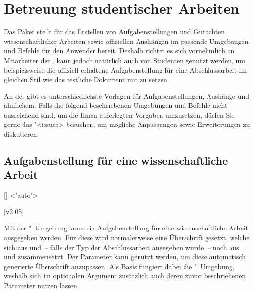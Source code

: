 \chapter[%
  Das Paket \PackageRaw{tudscrsupervisor}{\BooleanFalse}
  -- Studentische Betreuung%
]{%
  Betreuung studentischer Arbeiten%
}

\begin{DeclareEntity}{}
%
Das Paket  stellt für das Erstellen von 
Aufgabenstellungen und Gutachten wissenschaftlicher Arbeiten sowie offiziellen 
Aushängen im \CD passende Umgebungen und Befehle für den Anwender bereit. 
Deshalb richtet es sich vornehmlich an Mitarbeiter der \TnUD, kann jedoch 
natürlich auch von Studenten genutzt werden, um beispielsweise die offiziell 
erhaltene Aufgabenstellung für eine Abschlussarbeit im gleichen Stil wie das 
restliche Dokument mit  zu setzen.

An der \TUD gibt es unterschiedlichste Vorlagen für Aufgabenstellungen, 
Aushänge und ähnlichem. Falls die folgend beschriebenen Umgebungen und Befehle 
nicht ausreichend sind, um die Ihnen auferlegten Vorgaben umzusetzen, dürfen 
Sie gerne das \GitHubRepo'<issues> besuchen, um mögliche Anpassungen sowie 
Erweiterungen zu diskutieren.



\section{%
  Aufgabenstellung für eine wissenschaftliche Arbeit%
}

\begin{Declaration}
  {[]}
  <'auto'>
\begin{Declaration}
  {}
\begin{Declaration}
  {}
  [v2.05]
\printdeclarationlist

Mit der "~Umgebung kann ein Aufgabenstellung für eine 
wissenschaftliche Arbeit ausgegeben werden. Für diese wird normalerweise eine 
Überschrift gesetzt, welche sich aus  und~-- falls der Typ der 
Abschlussarbeit angegeben wurde~-- noch aus  und  
zusammensetzt. Der Parameter  kann genutzt 
werden, um diese automatisch generierte Überschrift anzupassen. Als Basis 
fungiert dabei die "~Umgebung, weshalb sich im optionalen 
Argument zusätzlich auch deren zuvor beschriebenen Parameter nutzen lassen.


\end{Declaration}
\end{Declaration}
\end{Declaration}
\end{DeclareEntity}

